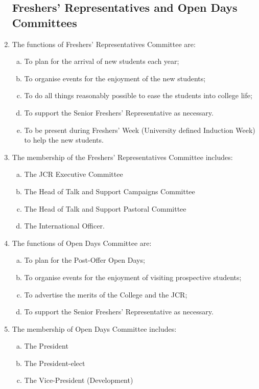 \documentclass[12pt]{article}  %
\begin{document}
\begin{enumerate}
	\subsection{Freshers’ Representatives and Open Days Committees}
	\item The functions of Freshers’ Representatives Committee are:
	\begin{enumerate}[(a)]
		\item To plan for the arrival of new students each year;
		\item To organise events for the enjoyment of the new students;
		\item To do all things reasonably possible to ease the students into college life;
		\item To support the Senior Freshers’ Representative as necessary.
		\item To be present during Freshers’ Week (University defined Induction Week) to help the new students.
	\end{enumerate}
	\item The membership of the Freshers’ Representatives Committee includes:
	\begin{enumerate}[(a)]
		\item The JCR Executive Committee
		\item The Head of Talk and Support Campaigns Committee
		\item The Head of Talk and Support Pastoral Committee
		\item The International Officer.
	\end{enumerate}
	\item The functions of Open Days Committee are:
	\begin{enumerate}[(a)]
		\item To plan for the Post-Offer Open Days;
		\item To organise events for the enjoyment of visiting prospective students;
		\item To advertise the merits of the College and the JCR;
		\item To support the Senior Freshers’ Representative as necessary.
	\end{enumerate}
	\item The membership of Open Days Committee includes:
	\begin{enumerate}[(a)]
		\item The President
		\item The President-elect
		\item The Vice-President (Development)

\end{enumerate}
\end{enumerate}
\end{document}
